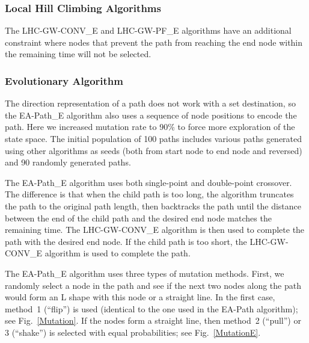 %

\subsubsection{Local Hill Climbing Algorithms}

The LHC-GW-CONV\_E and LHC-GW-PF\_E algorithms have an additional constraint where nodes that prevent the path from reaching the end node within the remaining time will not be selected.

\subsubsection{Evolutionary Algorithm}

The direction representation of a path does not work with a set destination, so the EA-Path\_E algorithm also uses a sequence of node positions to encode the path. Here we increased mutation rate to 90\% to force more exploration of the state space. The initial population of 100 paths includes various paths generated using other algorithms as seeds (both from start node to end node and reversed) and 90 randomly generated paths.

The EA-Path\_E algorithm uses both single-point and double-point crossover. The difference is that when the child path is too long, the algorithm truncates the path to the original path length, then backtracks the path until the distance between the end of the child path and the desired end node matches the remaining time. The LHC-GW-CONV\_E algorithm is then used to complete the path with the desired end node. If the child path is too short, the LHC-GW-CONV\_E algorithm is used to complete the path.

The EA-Path\_E algorithm uses three types of mutation methods. First, we randomly select a node in the path and see if the next two nodes along the path would form an L shape with this node or a straight line. In the first case, method~1 (``flip'') is used (identical to the one used in the EA-Path algorithm); see Fig.~\ref{Mutation}. If the nodes form a straight line, then method~2 (``pull'') or 3 (``shake'') is selected with equal probabilities; see Fig.~\ref{MutationE}.

